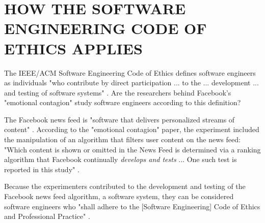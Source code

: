 \section{HOW THE SOFTWARE ENGINEERING CODE OF ETHICS APPLIES}
The IEEE/ACM Software Engineering Code of Ethics defines software engineers as individuals "who contribute by direct participation ... to the ... development ... and testing of software systems" \cite{code}.  Are the researchers behind Facebook's "emotional contagion" study software engineers according to this definition? \par
The Facebook news feed is "software that delivers personalized streams of content" \cite{define-news-feed}.
According to the "emotional contagion" paper, the experiment included the manipulation of an algorithm that filters user content on the news feed:
"Which content is shown or omitted in the News Feed is determined via a ranking algorithm that Facebook continually \textit{develops and tests} ... One such test is reported in this study" \cite{study}. \par
Because the experimenters contributed to the development and testing of the Facebook news feed algorithm, a software system, they can be considered software engineers who "shall adhere to the [Software Engineering] Code of Ethics and Professional Practice" \cite{code}.
\vspace{0.4cm}
